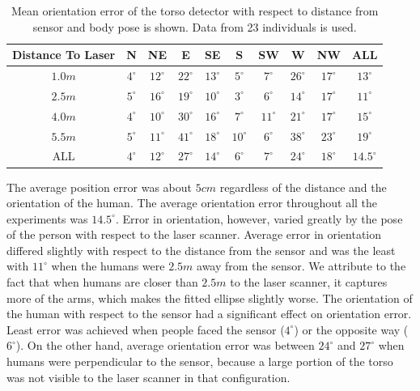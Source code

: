\begin{table}[ht!]
\caption{Mean orientation error of the torso detector with respect to distance from sensor and body pose is shown. Data from 23 individuals is used.}
\centering
\begin{tabular}{cSSSSSSSSS}    
\toprule
Distance To Laser & {N} & {NE} & {E} & {SE} & {S} & {SW} & {W} & {NW} & {ALL}\\
\midrule
{$1.0m$} & {$4^{\circ}$} & {$12^{\circ}$} & {$22^{\circ}$} & {$13^{\circ}$} & {$5^{\circ}$} & {$7^{\circ}$} & {$26^{\circ}$} & {$17^{\circ}$} & {$13^{\circ}$} \\
{$2.5m$} & {$5^{\circ}$} & {$16^{\circ}$} & {$19^{\circ}$} & {$10^{\circ}$} & {$3^{\circ}$} & {$6^{\circ}$} & {$14^{\circ}$} & {$17^{\circ}$} & {$11^{\circ}$} \\ 

{$4.0m$} & {$4^{\circ}$} & {$10^{\circ}$} & {$30^{\circ}$} & {$16^{\circ}$} & {$7^{\circ}$} & {$11^{\circ}$} & {$21^{\circ}$} & {$17^{\circ}$} & {$15^{\circ}$} \\ 
{$5.5m$} & {$5^{\circ}$} & {$11^{\circ}$} & {$41^{\circ}$} & {$18^{\circ}$} & {$10^{\circ}$} & {$6^{\circ}$} & {$38^{\circ}$} & {$23^{\circ}$} & {$19^{\circ}$} \\ 

{ALL} & {$4^{\circ}$} & {$12^{\circ}$} & {$27^{\circ}$} & {$14^{\circ}$} & {$6^{\circ}$} & {$7^{\circ}$} & {$24^{\circ}$} & {$18^{\circ}$} & {$14.5^{\circ}$} \\
\bottomrule
\end{tabular}
\label{table:torso_tracking_results}
\end{table}

The average position error was about $5cm$ regardless of the distance and the orientation of the human. The average orientation error throughout all the experiments was $14.5^{\circ}$. Error in orientation, however, varied greatly by the pose of the person with respect to the laser scanner. Average error in orientation differed slightly with respect to the distance from the sensor and was the least with $11^{\circ}$ when the humans were $2.5m$ away from the sensor. We attribute to the fact that when humans are closer than $2.5m$ to the laser scanner, it captures more of the arms, which makes the fitted ellipse slightly worse. The orientation of the human with respect to the sensor had a significant effect on orientation error. Least error was achieved when people faced the sensor  ($4^{\circ}$) or the opposite way ($6^{\circ}$). On the other hand, average orientation error was between $24^{\circ}$ and $27^{\circ}$ when humans were perpendicular to the sensor, because a large portion of the torso was not visible to the laser scanner in that configuration.

